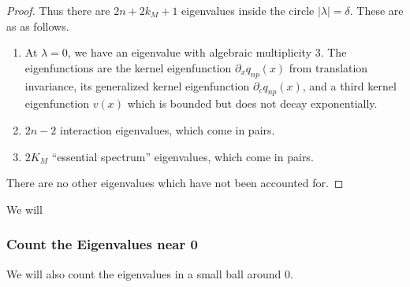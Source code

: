 \documentclass[thesis.tex]{subfiles}
\begin{document}
\begin{lemma}
\begin{proof}
Thus there are $2n + 2 k_M + 1$ eigenvalues inside the circle $|\lambda| = \delta$. These are as as follows.
\begin{enumerate}
	\item At $\lambda = 0$, we have an eigenvalue with algebraic multiplicity 3. The eigenfunctions are the kernel eigenfunction $\partial_x q_{np}(x)$ from translation invariance, its generalized kernel eigenfunction $\partial_c q_{np}(x)$, and a third kernel eigenfunction $v(x)$ which is bounded but does not decay exponentially.
	\item $2n - 2$ interaction eigenvalues, which come in pairs.
	\item $2 K_M$ ``essential spectrum'' eigenvalues, which come in pairs.
\end{enumerate}

There are no other eigenvalues which have not been accounted for.
\end{proof}
\end{lemma}

We will

\subsubsection{Count the Eigenvalues near 0}

We will also count the eigenvalues in a small ball around 0.  
\end{document}
